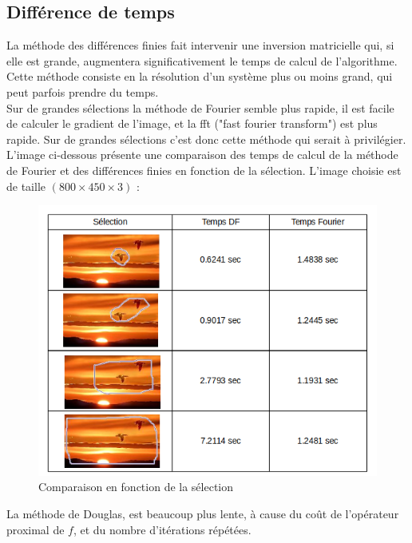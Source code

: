 \subsection{Différence de temps}
La méthode des différences finies fait intervenir une inversion matricielle qui, si elle est grande, augmentera significativement le temps de calcul de l'algorithme. Cette méthode consiste en la résolution d'un système plus ou moins grand, qui peut parfois prendre du temps. \\
Sur de grandes sélections la méthode de Fourier semble plus rapide, il est facile de calculer le gradient de l'image, et la fft ("fast fourier transform") est plus rapide. Sur de grandes sélections c'est donc cette méthode qui serait à privilégier.\\
L'image ci-dessous présente une comparaison des temps de calcul de la méthode de Fourier et des différences finies en fonction de la sélection. L'image choisie est de taille $(800 \times 450 \times 3)$ :
\begin{figure}[H]
\centering
\includegraphics[scale=0.4]{Images/comparaisonFD.png}
\caption{Comparaison en fonction de la sélection}
\end{figure}
La méthode de Douglas, est beaucoup plus lente, à cause du coût de l'opérateur proximal de $f$, et du nombre d'itérations répétées.  
